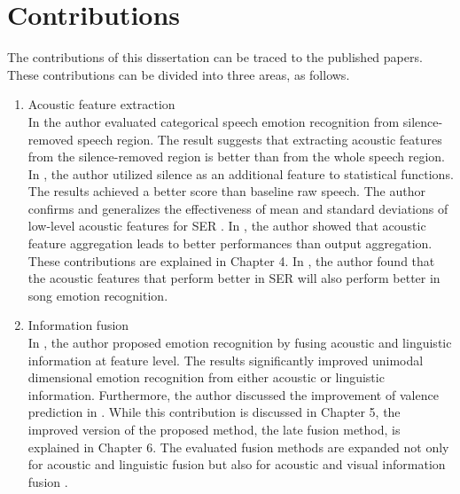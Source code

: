 \section{Contributions}
The contributions of this dissertation can be traced to the published papers.
These contributions can be divided into three areas, as follows.
\begin{enumerate}
\item Acoustic feature extraction \\
In \cite{Atmaja2019} the author evaluated categorical speech emotion
recognition from silence-removed speech region. The result suggests that
extracting acoustic features from the silence-removed region is better than
from the whole speech region. In \cite{Atmaja2020f}, the author utilized
silence as an additional feature to statistical functions. The results achieved
a better score than baseline raw speech. The author confirms and generalizes
the effectiveness of mean and standard deviations of low-level acoustic
features for SER \cite{Atmaja2020f, Atmaja2020d}. In \cite{Atmaja2020h}, the
author showed that acoustic feature aggregation leads to better performances
than output aggregation. These contributions are explained in Chapter 4. In
\cite{Atmaja2020j}, the author found that the acoustic features that perform
better in SER will also perform better in song emotion recognition.

\item Information fusion \\
In \cite{Atmaja2019b, Atmaja2020d, Atmaja2020h}, the author proposed emotion
recognition by fusing acoustic and linguistic information at feature level. The
results significantly improved unimodal dimensional emotion recognition from
either acoustic or linguistic information. Furthermore, the author discussed the
improvement of valence prediction in \cite{Atmaja2020e}. While this
contribution is discussed in Chapter 5, the improved version of the proposed
method, the late fusion method, is explained in Chapter 6. The evaluated fusion
methods are expanded not only for acoustic and linguistic fusion but also for
acoustic and visual information fusion \cite{Atmaja2020, Elbarougy2020}. 


\end{enumerate}
